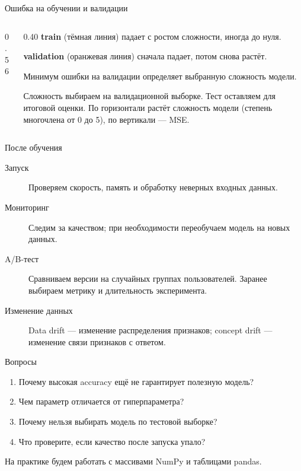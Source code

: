 \begin{frame}[c]{Ошибка на обучении и валидации}
  \begin{columns}[T]
    \begin{column}{0.56\textwidth}
      \centering
      
    \end{column}
    \begin{column}{0.40\textwidth}
      \small
      \textbf{train} (тёмная линия) падает с ростом сложности, иногда до нуля.

      \smallskip
      \textbf{validation} (оранжевая линия) сначала падает, потом снова растёт.

      \smallskip
      Минимум ошибки на валидации определяет выбранную сложность модели.

      \smallskip
      \footnotesize\color{acGray}Сложность выбираем на валидационной выборке. Тест оставляем для итоговой оценки.
      По горизонтали растёт сложность модели (степень многочлена от 0 до 5), по вертикали --- MSE.
    \end{column}
  \end{columns}
\end{frame}

\begin{frame}{После обучения}
  \begin{description}
    \item[Запуск] Проверяем скорость, память и обработку неверных входных данных.
    \item[Мониторинг] Следим за качеством; при необходимости переобучаем модель на новых данных.
    \item[A/B-тест] Сравниваем версии на случайных группах пользователей.
      Заранее выбираем метрику и длительность эксперимента.
    \item[Изменение данных] Data drift --- изменение распределения признаков;
      concept drift --- изменение связи признаков с ответом.
  \end{description}
\end{frame}

\begin{frame}{Вопросы}
  \begin{enumerate}
    \item Почему высокая accuracy ещё не гарантирует полезную модель?
    \item Чем параметр отличается от гиперпараметра?
    \item Почему нельзя выбирать модель по тестовой выборке?
    \item Что проверите, если качество после запуска упало?
  \end{enumerate}
  \medskip
  На практике будем работать с массивами NumPy и таблицами pandas.
\end{frame}
